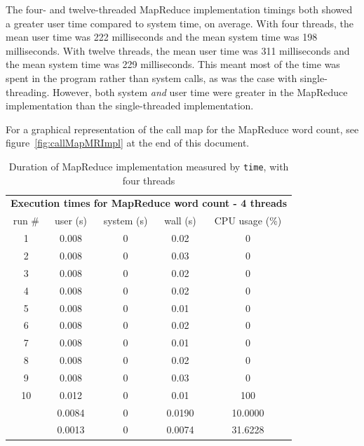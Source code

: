 \documentclass[12pt, letterpaper]{article}
\begin{document}
	The four- and twelve-threaded MapReduce implementation timings both showed a greater user time compared to system time, on average.
	With four threads, the mean user time was 222 milliseconds and the mean system time was 198 milliseconds.
	With twelve threads, the mean user time was 311 milliseconds and the mean system time was 229 milliseconds.
	This meant most of the time was spent in the program rather than system calls, as was the case with single-threading.
	However, both system \textit{and} user time were greater in the MapReduce implementation than the single-threaded implementation.

	For a graphical representation of the call map for the MapReduce word count, see figure~\ref{fig:callMapMRImpl} at the end of this document.
	\begin{table}[h]
	\centering
	\begin{tabular}{ccccc}
	\multicolumn{5}{c}{\cellcolor[HTML]{FFFFC7}\textbf{Execution times for MapReduce word count - 4 threads}} \\
	\cellcolor[HTML]{EFEFEF}run \# & \cellcolor[HTML]{EFEFEF}user (s) & \cellcolor[HTML]{EFEFEF}system (s) & 				\cellcolor[HTML]{EFEFEF}wall (s) & \cellcolor[HTML]{EFEFEF}CPU usage (\%) \\
	1 & 0.008 & 0 & 0.02 & 0 \\
	2 & 0.008 & 0 & 0.03 & 0 \\
	3 & 0.008 & 0 & 0.02 & 0 \\
	4 & 0.008 & 0 & 0.02 & 0 \\
	5 & 0.008 & 0 & 0.01 & 0 \\
	6 & 0.008 & 0 & 0.02 & 0 \\
	7 & 0.008 & 0 & 0.01 & 0 \\
	8 & 0.008 & 0 & 0.02 & 0 \\
	9 & 0.008 & 0 & 0.03 & 0 \\
	10 & 0.012 & 0 & 0.01 & 100 \\
	\rowcolor[HTML]{D0F0D0} 
	\multicolumn{1}{r}{\cellcolor[HTML]{9AFF99}mean (s)} & 0.0084 & 0 & 0.0190 & 10.0000 \\
	\rowcolor[HTML]{ECF4FF} 
	\multicolumn{1}{r}{\cellcolor[HTML]{DAE8FC}std. dev. (s)} & 0.0013 & 0 & 0.0074 & 31.6228
	\end{tabular}
	\caption{Duration of MapReduce implementation measured by \texttt{time}, with four threads\label{table:MR4ImplWC}}
	\end{table}
\end{document}
